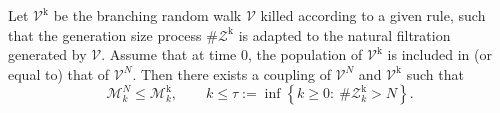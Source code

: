 \begin{lemma}
Let $\mathcal V^{\mathrm k}$ be the branching random walk $\mathcal V$ killed according to a given rule, such that the generation size process $\#\mathcal Z^{\mathrm k}$ is adapted to the natural filtration generated by $\mathcal V$.
Assume that at time $0$, the population of $\mathcal V^{\mathrm k}$ is included in (or equal to) that of $\mathcal V^N$.
Then there exists a coupling of $\mathcal V^N$ and $\mathcal V^{\mathrm k}$ such that
\[
    \mathcal M^N_k
    \le
    \mathcal M^{\mathrm k}_k,
    \qquad
    k\le\tau:=\inf\left\{
        k\ge 0:\ \#\mathcal Z^{\mathrm k}_k>N
    \right\}.
\]
\end{lemma}
